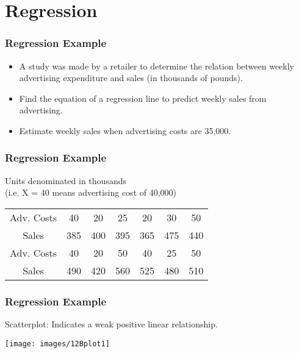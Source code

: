 \documentclass[]{report}
\begin{document}
	\chapter{Regression}
	
	
	\subsection{Regression Example}
	\begin{itemize}
		\item A study was made by a retailer to determine the relation between weekly advertising
		expenditure and sales (in thousands of pounds).
		\item Find the equation of a regression line
		to predict weekly sales from advertising.
		\item Estimate weekly sales when advertising
		costs are 35,000.
	\end{itemize}
	
	
	\subsection{Regression Example}
	Units denominated in thousands \\(i.e. X = 40 means advertising cost of 40,000)
	\begin{center}
		\begin{tabular}{|c|c|c|c|c|c|c|}
			\hline
			Adv. Costs & 40 & 20 & 25 & 20 & 30 & 50\\
			Sales & 385& 400& 395& 365& 475& 440\\ \hline \hline
			Adv. Costs & 40 & 20 & 50 & 40 & 25 & 50\\
			Sales & 490& 420& 560& 525& 480& 510\\
			\hline
		\end{tabular}
	\end{center}
	
	
	
	\subsection{Regression Example}
	Scatterplot: Indicates a weak positive linear relationship.
	\begin{center}
		\texttt{[image: images/12Bplot1]}
	\end{center}
	
\end{document}
